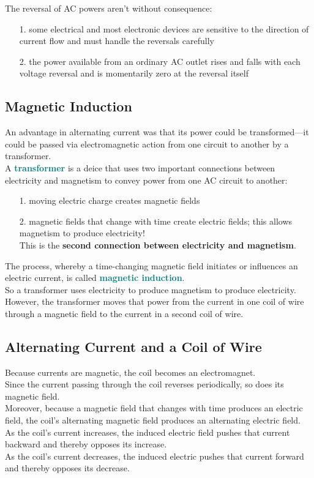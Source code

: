 \documentclass[12pt]{article}
\theoremstyle{definition}
\newcommand{\defnterm}[1]{\textbf{\textcolor{teal}{#1}}\index{#1}}
\begin{document}
The reversal of AC powers aren't without consequence:
\begin{enumerate}
  \item[1.] some electrical and most electronic devices are sensitive to the direction of current flow and must handle the reversals carefully
  \item[2.] the power available from an ordinary AC outlet rises and falls with each voltage reversal and is momentarily zero at the reversal itself
\end{enumerate}

\subsection{Magnetic Induction}
An advantage in alternating current was that its power could be transformed---it could be passed via electromagnetic action from one circuit to another by a transformer. \\
A \defnterm{transformer} is a deice that uses two important connections between electricity and magnetism to convey power from one AC circuit to another:
\begin{enumerate}
  \item[1.] moving electric charge creates magnetic fields
  \item[2.] magnetic fields that change with time create electric fields;
  this allows magnetism to produce electricity! \\
  This is the \textbf{second connection between electricity and magnetism}.
\end{enumerate}

The process, whereby a time-changing magnetic field initiates or influences an electric current, is called \defnterm{magnetic induction}. \\

So a transformer uses electricity to produce magnetism to produce electricity. \\
However, the transformer moves that power from the current in one coil of wire through a magnetic field to the current in a second coil of wire.

\subsection{Alternating Current and a Coil of Wire}
Because currents are magnetic, the coil becomes an electromagnet. \\
Since the current passing through the coil reverses periodically, so does its magnetic field. \\
Moreover, because a magnetic field that changes with time produces an electric field, the coil's alternating magnetic field produces an alternating electric field. \\
As the coil's current increases, the induced electric field pushes that current backward and thereby opposes its increase. \\
As the coil's current decreases, the induced electric pushes that current forward and thereby opposes its decrease. \\
\end{document}
